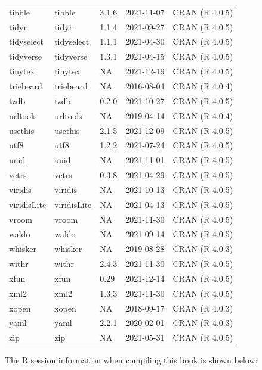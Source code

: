 \begin{tabular}{lllll}
tibble & tibble & 3.1.6 & 2021-11-07 & CRAN (R 4.0.5)\\
tidyr & tidyr & 1.1.4 & 2021-09-27 & CRAN (R 4.0.5)\\
\addlinespace
tidyselect & tidyselect & 1.1.1 & 2021-04-30 & CRAN (R 4.0.5)\\
tidyverse & tidyverse & 1.3.1 & 2021-04-15 & CRAN (R 4.0.5)\\
tinytex & tinytex & NA & 2021-12-19 & CRAN (R 4.0.5)\\
triebeard & triebeard & NA & 2016-08-04 & CRAN (R 4.0.4)\\
tzdb & tzdb & 0.2.0 & 2021-10-27 & CRAN (R 4.0.5)\\
\addlinespace
urltools & urltools & NA & 2019-04-14 & CRAN (R 4.0.4)\\
usethis & usethis & 2.1.5 & 2021-12-09 & CRAN (R 4.0.5)\\
utf8 & utf8 & 1.2.2 & 2021-07-24 & CRAN (R 4.0.5)\\
uuid & uuid & NA & 2021-11-01 & CRAN (R 4.0.5)\\
vctrs & vctrs & 0.3.8 & 2021-04-29 & CRAN (R 4.0.5)\\
\addlinespace
viridis & viridis & NA & 2021-10-13 & CRAN (R 4.0.5)\\
viridisLite & viridisLite & NA & 2021-04-13 & CRAN (R 4.0.5)\\
vroom & vroom & NA & 2021-11-30 & CRAN (R 4.0.5)\\
waldo & waldo & NA & 2021-09-14 & CRAN (R 4.0.5)\\
whisker & whisker & NA & 2019-08-28 & CRAN (R 4.0.3)\\
\addlinespace
withr & withr & 2.4.3 & 2021-11-30 & CRAN (R 4.0.5)\\
xfun & xfun & 0.29 & 2021-12-14 & CRAN (R 4.0.5)\\
xml2 & xml2 & 1.3.3 & 2021-11-30 & CRAN (R 4.0.5)\\
xopen & xopen & NA & 2018-09-17 & CRAN (R 4.0.3)\\
yaml & yaml & 2.2.1 & 2020-02-01 & CRAN (R 4.0.3)\\
\addlinespace
zip & zip & NA & 2021-05-31 & CRAN (R 4.0.5)\\
\bottomrule
\end{tabular}

The R session information when compiling this book is shown below:

